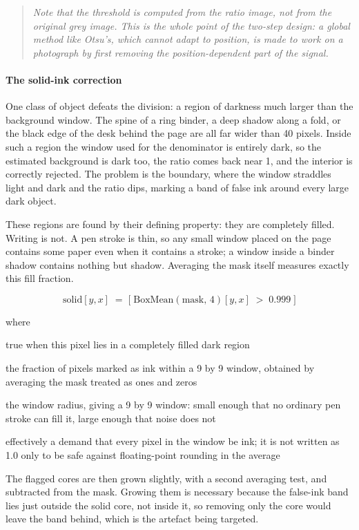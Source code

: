 \begin{quote}\small\itshape Note that the threshold is computed from the ratio image, not from the original grey image. This is the whole point of the two-step design: a global method like Otsu's, which cannot adapt to position, is made to work on a photograph by first removing the position-dependent part of the signal.\end{quote}

\paragraph{The solid-ink correction}
One class of object defeats the division: a region of darkness much larger than the background window. The spine of a ring binder, a deep shadow along a fold, or the black edge of the desk behind the page are all far wider than 40 pixels. Inside such a region the window used for the denominator is entirely dark, so the estimated background is dark too, the ratio comes back near 1, and the interior is correctly rejected. The problem is the boundary, where the window straddles light and dark and the ratio dips, marking a band of false ink around every large dark object.

These regions are found by their defining property: they are completely filled. Writing is not. A pen stroke is thin, so any small window placed on the page contains some paper even when it contains a stroke; a window inside a binder shadow contains nothing but shadow. Averaging the mask itself measures exactly this fill fraction.


\begin{equation}
\mathrm{solid}[y,x] \;=\; \big[\;\mathrm{BoxMean}(\mathrm{mask},\,4)[y,x] \;>\; 0.999\;\big]
\end{equation}

\noindent where
\begin{description}[leftmargin=2.4em,style=nextline,font=\normalfont\ttfamily]\setlength\itemsep{1pt}
  \item[{$\mathrm{solid}[y,x]$}] \normalfont true when this pixel lies in a completely filled dark region
  \item[{$\mathrm{BoxMean}(\mathrm{mask},4)$}] \normalfont the fraction of pixels marked as ink within a 9 by 9 window, obtained by averaging the mask treated as ones and zeros
  \item[{$4$}] \normalfont the window radius, giving a 9 by 9 window: small enough that no ordinary pen stroke can fill it, large enough that noise does not
  \item[{$0.999$}] \normalfont effectively a demand that every pixel in the window be ink; it is not written as 1.0 only to be safe against floating-point rounding in the average
\end{description}
The flagged cores are then grown slightly, with a second averaging test, and subtracted from the mask. Growing them is necessary because the false-ink band lies just outside the solid core, not inside it, so removing only the core would leave the band behind, which is the artefact being targeted.


